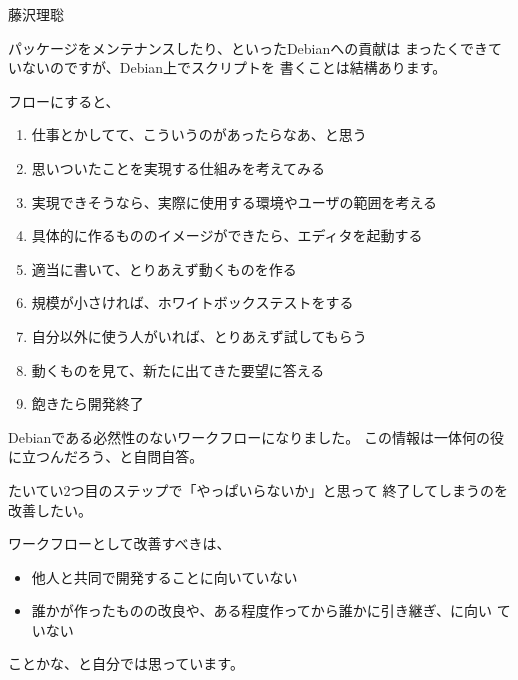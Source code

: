 \begin{prework}{藤沢理聡}

パッケージをメンテナンスしたり、といったDebianへの貢献は
まったくできていないのですが、Debian上でスクリプトを
書くことは結構あります。

フローにすると、
\begin{enumerate}
\item 仕事とかしてて、こういうのがあったらなあ、と思う
\item 思いついたことを実現する仕組みを考えてみる
\item 実現できそうなら、実際に使用する環境やユーザの範囲を考える
\item 具体的に作るもののイメージができたら、エディタを起動する
\item 適当に書いて、とりあえず動くものを作る
\item 規模が小さければ、ホワイトボックステストをする
\item 自分以外に使う人がいれば、とりあえず試してもらう
\item 動くものを見て、新たに出てきた要望に答える
\item 飽きたら開発終了
\end{enumerate}

Debianである必然性のないワークフローになりました。
この情報は一体何の役に立つんだろう、と自問自答。


たいてい2つ目のステップで「やっぱいらないか」と思って
終了してしまうのを改善したい。

ワークフローとして改善すべきは、
\begin{itemize}
\item 他人と共同で開発することに向いていない
\item 誰かが作ったものの改良や、ある程度作ってから誰かに引き継ぎ、に向い
      ていない
\end{itemize}
ことかな、と自分では思っています。
\end{prework}

